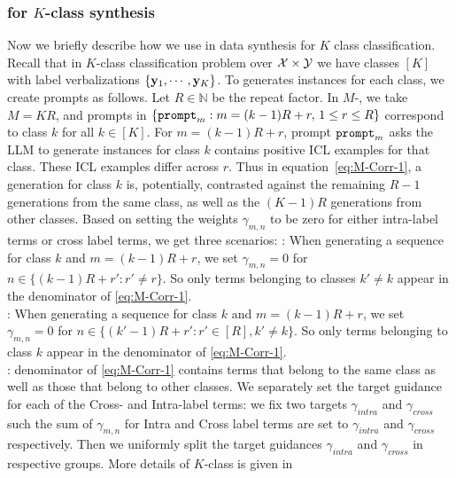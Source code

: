 \subsubsection{\corrsyn{} for $K$-class synthesis}
Now we briefly describe how we use \corrsyn{} in data synthesis for $K$ class classification. Recall that in $K$-class classification problem over $\mathcal{X}\times\mathcal{Y}$ we have classes $[K]$ with label verbalizations $\{\mathbf{y}_1,\cdots,\mathbf{y}_K\}$. To generates instances for each class, we create prompts as follows. Let $R\in\mathbb{N}$ be the repeat factor. In $M$-\corrsyn{}, we take $M=KR$, and prompts in $\{\mathtt{prompt}_{m}:m=(k-1)R+r,\, 1\leq r\leq R\}$ correspond to class $k$ for all $k\in[K]$. For $m=(k-1)R+r$, prompt $\mathtt{prompt}_{m}$ asks the LLM to generate instances for class $k$ contains positive ICL examples for that class. These ICL examples differ across $r$. Thus in equation~\eqref{eq:M-Corr-1}, a generation for class $k$ is, potentially, contrasted against the remaining $R-1$ generations from the same class, as well as the $(K-1)R$ generations from other classes. Based on setting the weights $\gamma_{m,n}$ to be zero for either intra-label terms or cross label terms, we get three scenarios:
: When generating a sequence for class $k$ and $m=(k-1)R+r$, we set $\gamma_{m,n}=0$ for $n\in\{(k-1)R+r':r'\neq r\}$. So only terms belonging to classes $k'\neq k$ appear in the denominator of \eqref{eq:M-Corr-1}.\\
:  When generating a sequence for class $k$ and $m=(k-1)R+r$, we set $\gamma_{m,n}=0$ for $n\in\{(k'-1)R+r':r'\in[R],k'\neq k\}$. So only terms belonging to class $k$ appear in the denominator of \eqref{eq:M-Corr-1}.\\
: denominator of \eqref{eq:M-Corr-1} contains terms that belong to the same class as well as those that belong to other classes. We separately set the target guidance for each of the Cross- and Intra-label terms: we fix two targets $\gamma_{intra}$ and $\gamma_{cross}$ such the sum of $\gamma_{m,n}$ for Intra and Cross label terms are set to $\gamma_{intra}$ and $\gamma_{cross}$ respectively. Then we uniformly split the target guidances $\gamma_{intra}$ and $\gamma_{cross}$ in respective groups. More details of $K$-class \corrsyn{} is given in 


